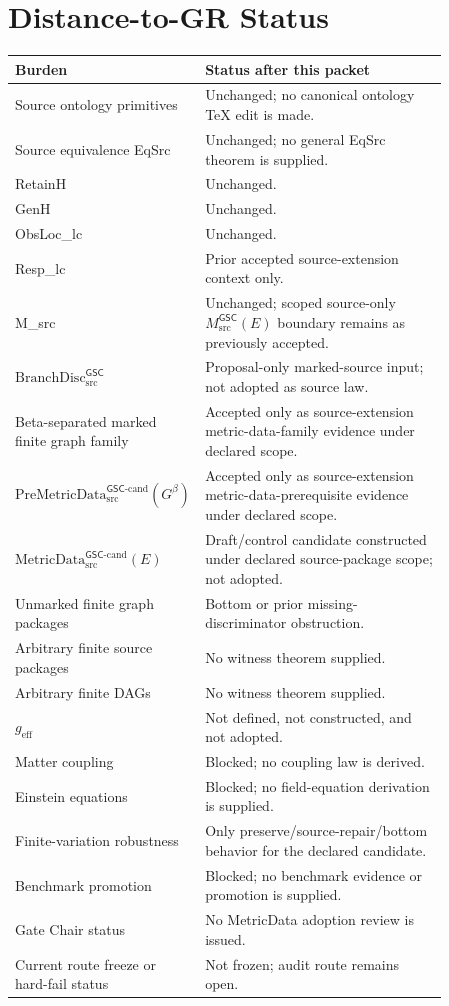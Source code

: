 \documentclass[11pt]{article}
\newcommand{\PreMetricData}{\mathrm{PreMetricData}_{\mathrm{src}}^{\mathsf{GSC}\mbox{-}\mathrm{cand}}}
\newcommand{\MetricData}{\mathrm{MetricData}_{\mathrm{src}}^{\mathsf{GSC}\mbox{-}\mathrm{cand}}}
\newcommand{\BranchDisc}{\mathrm{BranchDisc}_{\mathrm{src}}^{\mathsf{GSC}}}
\newcommand{\Gbeta}{G^\beta}
\newcommand{\geff}{g_{\mathrm{eff}}}
\begin{document}
\section{Distance-to-GR Status}

\begin{longtable}{p{0.30\linewidth}p{0.56\linewidth}}
\toprule
Burden & Status after this packet \\
\midrule
Source ontology primitives & Unchanged; no canonical ontology TeX edit is made. \\
Source equivalence EqSrc & Unchanged; no general EqSrc theorem is supplied. \\
RetainH & Unchanged. \\
GenH & Unchanged. \\
ObsLoc\_lc & Unchanged. \\
Resp\_lc & Prior accepted source-extension context only. \\
M\_src & Unchanged; scoped source-only \(M_{\mathrm{src}}^{\mathsf{GSC}}(E)\) boundary remains as previously accepted. \\
\(\BranchDisc\) & Proposal-only marked-source input; not adopted as source law. \\
Beta-separated marked finite graph family & Accepted only as source-extension metric-data-family evidence under declared scope. \\
\(\PreMetricData(\Gbeta)\) & Accepted only as source-extension metric-data-prerequisite evidence under declared scope. \\
\(\MetricData(E)\) & Draft/control candidate constructed under declared source-package scope; not adopted. \\
Unmarked finite graph packages & Bottom or prior missing-discriminator obstruction. \\
Arbitrary finite source packages & No witness theorem supplied. \\
Arbitrary finite DAGs & No witness theorem supplied. \\
\(\geff\) & Not defined, not constructed, and not adopted. \\
Matter coupling & Blocked; no coupling law is derived. \\
Einstein equations & Blocked; no field-equation derivation is supplied. \\
Finite-variation robustness & Only preserve/source-repair/bottom behavior for the declared candidate. \\
Benchmark promotion & Blocked; no benchmark evidence or promotion is supplied. \\
Gate Chair status & No MetricData adoption review is issued. \\
Current route freeze or hard-fail status & Not frozen; audit route remains open. \\
\bottomrule
\end{longtable}
\end{document}
